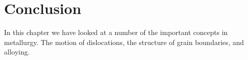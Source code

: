 \section{Conclusion}
In this chapter we have looked at a number of the important concepts
in metallurgy. The motion of dislocations, 
the structure of grain boundaries, and alloying. 


